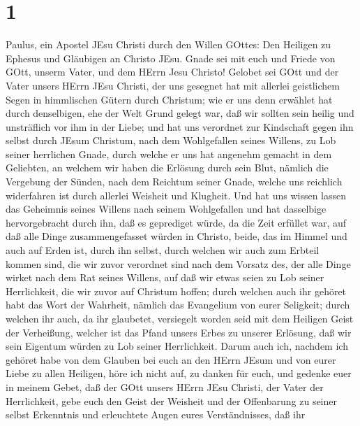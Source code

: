 \hypertarget{section}{%
\section{1}\label{section}}

 Paulus, ein Apostel JEsu Christi durch den Willen GOttes:
Den Heiligen zu Ephesus und Gläubigen an Christo JEsu. 
Gnade sei mit euch und Friede von GOtt, unserm Vater, und dem HErrn Jesu
Christo!  Gelobet sei GOtt und der Vater unsers HErrn JEsu
Christi, der uns gesegnet hat mit allerlei geistlichem Segen in
himmlischen Gütern durch Christum;  wie er uns denn erwählet
hat durch denselbigen, ehe der Welt Grund gelegt war, daß wir sollten
sein heilig und unsträflich vor ihm in der Liebe;  und hat
uns verordnet zur Kindschaft gegen ihn selbst durch JEsum Christum, nach
dem Wohlgefallen seines Willens,  zu Lob seiner herrlichen
Gnade, durch welche er uns hat angenehm gemacht in dem Geliebten,
 an welchem wir haben die Erlösung durch sein Blut, nämlich
die Vergebung der Sünden, nach dem Reichtum seiner Gnade, 
welche uns reichlich widerfahren ist durch allerlei Weisheit und
Klugheit.  Und hat uns wissen lassen das Geheimnis seines
Willens nach seinem Wohlgefallen und hat dasselbige hervorgebracht durch
ihn,  daß es geprediget würde, da die Zeit erfüllet war,
auf daß alle Dinge zusammengefasset würden in Christo, beide, das im
Himmel und auch auf Erden ist, durch ihn selbst,  durch
welchen wir auch zum Erbteil kommen sind, die wir zuvor verordnet sind
nach dem Vorsatz des, der alle Dinge wirket nach dem Rat seines Willens,
 auf daß wir etwas seien zu Lob seiner Herrlichkeit, die
wir zuvor auf Christum hoffen;  durch welchen auch ihr
gehöret habt das Wort der Wahrheit, nämlich das Evangelium von eurer
Seligkeit; durch welchen ihr auch, da ihr glaubetet, versiegelt worden
seid mit dem Heiligen Geist der Verheißung,  welcher ist
das Pfand unsers Erbes zu unserer Erlösung, daß wir sein Eigentum würden
zu Lob seiner Herrlichkeit.  Darum auch ich, nachdem ich
gehöret habe von dem Glauben bei euch an den HErrn JEsum und von eurer
Liebe zu allen Heiligen,  höre ich nicht auf, zu danken für
euch, und gedenke euer in meinem Gebet,  daß der GOtt
unsers HErrn JEsu Christi, der Vater der Herrlichkeit, gebe euch den
Geist der Weisheit und der Offenbarung zu seiner selbst Erkenntnis
 und erleuchtete Augen eures Verständnisses, daß ihr

